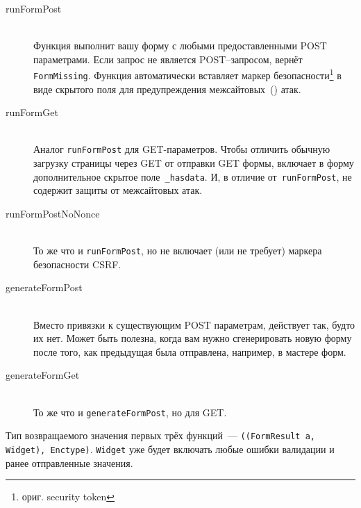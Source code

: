 \begin{description}
    \item[runFormPost] \hfill \\
        Функция выполнит вашу форму с любыми предоставленными POST
        параметрами. Если запрос не является POST--запросом, вернёт
        \lstinline'FormMissing'. Функция автоматически вставляет маркер
        безопасности\footnote{ориг. security token} в виде скрытого поля для предупреждения
        межсайтовых~()
        атак.

    \item[runFormGet] \hfill \\
        Аналог \lstinline'runFormPost' для GET-параметров. Чтобы отличить
        обычную загрузку страницы через GET от отправки GET формы, включает в
        форму дополнительное скрытое поле~\lstinline'_hasdata'. И, в отличие
        от~\lstinline'runFormPost', не содержит защиты от межсайтовых атак.

    \item[runFormPostNoNonce] \hfill \\
        То же что и \lstinline'runFormPost', но не включает (или не требует)
        маркера безопасности CSRF.

    \item[generateFormPost] \hfill \\
        Вместо привязки к существующим POST параметрам, действует так, будто
        их нет. Может быть полезна, когда вам нужно сгенерировать новую форму
        после того, как предыдущая была отправлена, например, в мастере форм.

    \item[generateFormGet] \hfill \\
        То же что и \lstinline'generateFormPost', но для GET.
\end{description}

Тип возвращаемого значения первых трёх функций~---
\lstinline'((FormResult a, Widget), Enctype)'.  \lstinline'Widget' уже будет
включать любые ошибки валидации и ранее отправленные значения.

